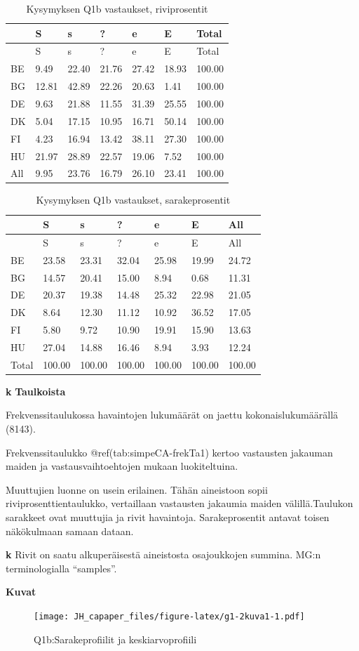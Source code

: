 \documentclass[
  finnish,
]{book}
\begin{document}
\begin{longtable}[]{@{}lllllll@{}}
\caption{Kysymyksen Q1b vastaukset, riviprosentit}\tabularnewline
\toprule
& S & s & ? & e & E & Total\tabularnewline
\midrule
\endfirsthead
\toprule
& S & s & ? & e & E & Total\tabularnewline
\midrule
\endhead
BE & 9.49 & 22.40 & 21.76 & 27.42 & 18.93 & 100.00\tabularnewline
BG & 12.81 & 42.89 & 22.26 & 20.63 & 1.41 & 100.00\tabularnewline
DE & 9.63 & 21.88 & 11.55 & 31.39 & 25.55 & 100.00\tabularnewline
DK & 5.04 & 17.15 & 10.95 & 16.71 & 50.14 & 100.00\tabularnewline
FI & 4.23 & 16.94 & 13.42 & 38.11 & 27.30 & 100.00\tabularnewline
HU & 21.97 & 28.89 & 22.57 & 19.06 & 7.52 & 100.00\tabularnewline
All & 9.95 & 23.76 & 16.79 & 26.10 & 23.41 & 100.00\tabularnewline
\bottomrule
\end{longtable}

\begin{longtable}[]{@{}lllllll@{}}
\caption{Kysymyksen Q1b vastaukset, sarakeprosentit}\tabularnewline
\toprule
& S & s & ? & e & E & All\tabularnewline
\midrule
\endfirsthead
\toprule
& S & s & ? & e & E & All\tabularnewline
\midrule
\endhead
BE & 23.58 & 23.31 & 32.04 & 25.98 & 19.99 & 24.72\tabularnewline
BG & 14.57 & 20.41 & 15.00 & 8.94 & 0.68 & 11.31\tabularnewline
DE & 20.37 & 19.38 & 14.48 & 25.32 & 22.98 & 21.05\tabularnewline
DK & 8.64 & 12.30 & 11.12 & 10.92 & 36.52 & 17.05\tabularnewline
FI & 5.80 & 9.72 & 10.90 & 19.91 & 15.90 & 13.63\tabularnewline
HU & 27.04 & 14.88 & 16.46 & 8.94 & 3.93 & 12.24\tabularnewline
Total & 100.00 & 100.00 & 100.00 & 100.00 & 100.00 &
100.00\tabularnewline
\bottomrule
\end{longtable}

\textbf{k} \textbf{Taulkoista}

Frekvenssitaulukossa havaintojen lukumäärät on jaettu
kokonaislukumäärällä (8143).

Frekvenssitaulukko @ref(tab:simpeCA-frekTa1) kertoo vastausten jakauman
maiden ja vastausvaihtoehtojen mukaan luokiteltuina.

Muuttujien luonne on usein erilainen. Tähän aineistoon sopii
riviprosenttientaulukko, vertaillaan vastausten jakaumia maiden
välillä.Taulukon sarakkeet ovat muuttujia ja rivit havaintoja.
Sarakeprosentit antavat toisen näkökulmaan samaan dataan.

\textbf{k} Rivit on saatu alkuperäisestä aineistosta osajoukkojen
summina. MG:n terminologialla ``samples''.

\textbf{Kuvat}

\begin{figure}
\centering
\texttt{[image: JH\_capaper\_files/figure-latex/g1-2kuva1-1.pdf]}
\caption{Q1b:Sarakeprofiilit ja keskiarvoprofiili}
\end{figure}
\end{document}
